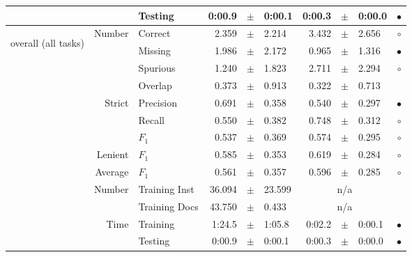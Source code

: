\begin{longtable}{|r|r|l||rcl|rcl|c|}
\cline{3-10} &                             &         Testing &      0:00.9 &  $\pm$  &      0:00.1 &      0:00.3 &  $\pm$  &      0:00.0 & $\bullet$ \\
\hline
\hline
\multirow{11}{*}{\begin{sideways}overall (all tasks)\end{sideways} }
             & \multirow{4}{*}{    Number} &         Correct &       2.359 &  $\pm$  &       2.214 &       3.432 &  $\pm$  &       2.656 & $\circ$ \\
\cline{3-10} &                             &         Missing &       1.986 &  $\pm$  &       2.172 &       0.965 &  $\pm$  &       1.316 & $\bullet$ \\
\cline{3-10} &                             &        Spurious &       1.240 &  $\pm$  &       1.823 &       2.711 &  $\pm$  &       2.294 & $\circ$ \\
\cline{3-10} &                             &         Overlap &       0.373 &  $\pm$  &       0.913 &       0.322 &  $\pm$  &       0.713 &  \\
\cline{2-10} & \multirow{3}{*}{    Strict} &       Precision &       0.691 &  $\pm$  &       0.358 &       0.540 &  $\pm$  &       0.297 & $\bullet$ \\
\cline{3-10} &                             &          Recall &       0.550 &  $\pm$  &       0.382 &       0.748 &  $\pm$  &       0.312 & $\circ$ \\
\cline{3-10} &                             &           $F_1$ &       0.537 &  $\pm$  &       0.369 &       0.574 &  $\pm$  &       0.295 & $\circ$ \\
\cline{2-10} &                     Lenient &           $F_1$ &       0.585 &  $\pm$  &       0.353 &       0.619 &  $\pm$  &       0.284 & $\circ$ \\
\cline{2-10} &                     Average &           $F_1$ &       0.561 &  $\pm$  &       0.357 &       0.596 &  $\pm$  &       0.285 & $\circ$ \\
\cline{2-10} & \multirow{2}{*}{    Number} &   Training Inst &      36.094 &  $\pm$  &      23.599 &    \multicolumn{3}{c|}{n/a}         &  \\
\cline{3-10} &                             &   Training Docs &      43.750 &  $\pm$  &       0.433 &    \multicolumn{3}{c|}{n/a}         &  \\
\cline{2-10} & \multirow{2}{*}{      Time} &        Training &      1:24.5 &  $\pm$  &      1:05.8 &      0:02.2 &  $\pm$  &      0:00.1 & $\bullet$ \\
\cline{3-10} &                             &         Testing &      0:00.9 &  $\pm$  &      0:00.1 &      0:00.3 &  $\pm$  &      0:00.0 & $\bullet$ \\
\hline
\end{longtable}

